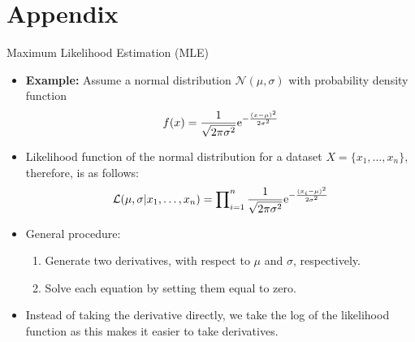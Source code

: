\appendix
\section{Appendix}

\begin{frame}{Maximum Likelihood Estimation (MLE)}
	\begin{itemize}
		\item \textbf{Example:} Assume a normal distribution $\mathcal{N}(\mu, \sigma)$ with probability density function
		      \begin{align*}
			      f(x)=\frac{1}{\sqrt{2\pi \sigma^2}} {\rm e}^{-\frac{(x-\mu)^2}{2\sigma^2}}
		      \end{align*}
		\item Likelihood function of the normal distribution for a dataset $X=\{x_1, \dots, x_n\}$, therefore, is as follows:
		      \vspace{-0.8em}
		      \begin{equation*}
			      \mathcal{L}(\mu, \sigma|x_1, \dots, x_n) = \prod\nolimits_{i=1}^n \frac{1}{\sqrt{2\pi \sigma^2}} {\rm e}^{-\frac{(x_i-\mu)^2}{2\sigma^2}}
		      \end{equation*}
		\item General procedure:
		      \begin{enumerate}
			      \item Generate two derivatives, with respect to $\mu$ and $\sigma$, respectively.
			      \item Solve each equation by setting them equal to zero.
		      \end{enumerate}
		\item Instead of taking the derivative directly, we take the log of the likelihood function as this makes it easier to take derivatives.
	\end{itemize}
\end{frame}

